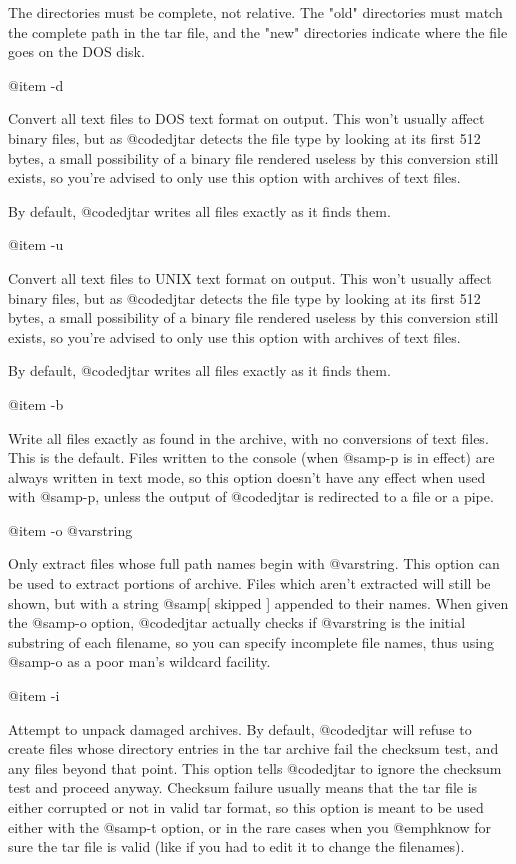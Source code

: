 The directories must be complete, not relative.  The "old" directories
must match the complete path in the tar file, and the "new" directories
indicate where the file goes on the DOS disk.

@item -d

Convert all text files to DOS text format on output.  This won't usually
affect binary files, but as @code{djtar} detects the file type by looking
at its first 512 bytes, a small possibility of a binary file rendered
useless by this conversion still exists, so you're advised to only use
this option with archives of text files.

By default, @code{djtar} writes all files exactly as it finds them.

@item -u

Convert all text files to UNIX text format on output.  This won't usually
affect binary files, but as @code{djtar} detects the file type by looking
at its first 512 bytes, a small possibility of a binary file rendered
useless by this conversion still exists, so you're advised to only use
this option with archives of text files.

By default, @code{djtar} writes all files exactly as it finds them.

@item -b

Write all files exactly as found in the archive, with no conversions of
text files.  This is the default.
Files written to the console (when @samp{-p} is in effect) are always
written in text mode, so this option doesn't have any effect when used
with @samp{-p}, unless the output of @code{djtar} is redirected to a file
or a pipe.

@item -o @var{string}

Only extract files whose full path names begin with @var{string}.
This option can be used to extract portions of archive.  Files which aren't
extracted will still be shown, but with a string @samp{[ skipped ]}
appended to their names.  When given the @samp{-o} option, @code{djtar}
actually checks if @var{string} is the initial substring of each filename,
so you can specify incomplete file names, thus using @samp{-o} as a poor man's
wildcard facility.

@item -i

Attempt to unpack damaged archives.
By default, @code{djtar} will refuse to create files whose directory
entries in the tar archive fail the checksum test, and any files beyond
that point.  This option tells @code{djtar} to ignore the checksum test
and proceed anyway.  Checksum failure usually means that the tar file is
either corrupted or not in valid tar format, so this option is meant to be
used either with the @samp{-t} option, or in the rare cases when you
@emph{know} for sure the tar file is valid (like if you had to edit it to
change the filenames).

